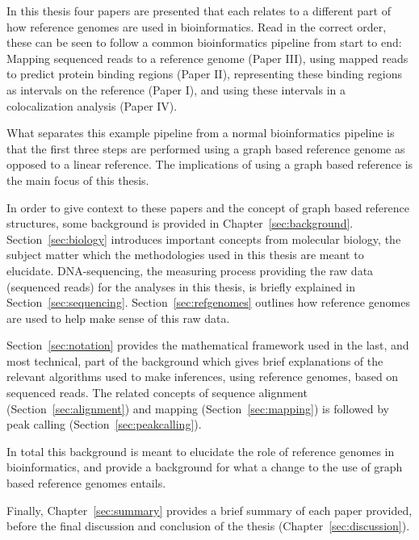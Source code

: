 In this thesis four papers are presented that each relates to a different part of how reference genomes are used in bioinformatics.
Read in the correct order, these can be seen to follow a common bioinformatics pipeline from start to end: Mapping sequenced reads to a reference genome (Paper III), using mapped reads to predict protein binding regions (Paper II), representing these binding regions as intervals on the reference (Paper I), and using these intervals in a colocalization analysis (Paper IV).

What separates this example pipeline from a normal bioinformatics pipeline is that the first three steps are performed using a graph based reference genome as opposed to a linear reference.
The implications of using a graph based reference is the main focus of this thesis.

In order to give context to these papers and the concept of graph based reference structures, some background is provided in Chapter~\ref{sec:background}.
Section~\ref{sec:biology} introduces important concepts from molecular biology, the subject matter which the methodologies used in this thesis are meant to elucidate.
DNA-sequencing, the measuring process providing the raw data (sequenced reads) for the analyses in this thesis, is briefly explained in Section~\ref{sec:sequencing}.
Section~\ref{sec:refgenomes} outlines how reference genomes are used to help make sense of this raw data.

Section~\ref{sec:notation} provides the mathematical framework used in the last, and most technical, part of the background which gives brief explanations of the relevant algorithms used to make inferences, using reference genomes, based on sequenced reads.
The related concepts of sequence alignment (Section~\ref{sec:alignment}) and mapping (Section~\ref{sec:mapping}) is followed by peak calling (Section~\ref{sec:peakcalling}).

In total this background is meant to elucidate the role of reference genomes in bioinformatics, and provide a background for what a change to the use of graph based reference genomes entails.

Finally, Chapter~\ref{sec:summary} provides a brief summary of each paper provided, before the final discussion and conclusion of the thesis (Chapter~\ref{sec:discussion}).

